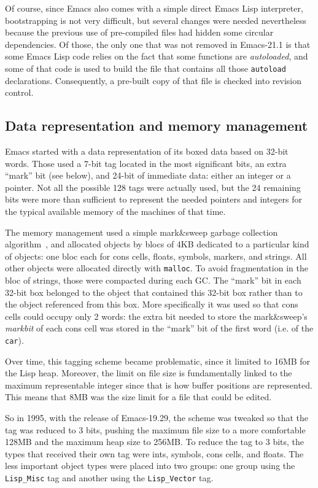 \documentclass[format=acmsmall, review]{acmart}
\newcommand \Elisp {Emacs Lisp}
\begin{document}
Of course, since Emacs also comes with a simple direct \Elisp{} interpreter,
bootstrapping is not very difficult, but several changes were needed
nevertheless because the previous use of pre-compiled files had hidden some
circular dependencies.  Of those, the only one that was not removed in
Emacs-21.1 is that some \Elisp{} code relies on the fact that some
functions are \emph{autoloaded}, and some of that code is used to build the
file that contains all those \texttt{autoload} declarations.  Consequently,
a pre-built copy of that file is checked into revision control.

\subsection{Data representation and memory management}
\label{sec:data-representation}

Emacs started with a data representation of its boxed data based on 32-bit
words.  Those used a 7-bit tag located in the most significant bits, an extra
``mark'' bit (see below), and 24-bit of immediate data: either an integer or
a pointer.  Not all the possible 128 tags were actually used, but the 24
remaining bits were more than sufficient to represent the needed pointers and
integers for the typical available memory of the machines of that time.

The memory management used a simple mark\&sweep garbage collection
algorithm~\cite{McCarthy1960}, and allocated objects by blocs of 4KB dedicated to a particular
kind of objects: one bloc each for cons cells, floats, symbols, markers, and
strings. All other objects were allocated directly with \texttt{malloc}.
To avoid fragmentation in the bloc of strings, those were compacted during
each GC.  The ``mark'' bit in each 32-bit box belonged to the object
that contained this 32-bit box rather than to the object referenced from
this box.  More specifically it was used so that cons cells could
occupy only 2 words: the extra bit needed to store the mark\&sweep's
\emph{markbit} of each cons cell was stored in the ``mark'' bit of the first
word (i.e. of the \texttt{car}).

Over time, this tagging scheme became problematic, since it limited to 16\;MB
for the Lisp heap.
Moreover, the limit on file size is fundamentally linked to the maximum representable
integer since that is how buffer positions are represented.
This means that 8\;MB was the size limit for a file that could be edited.

So in 1995, with the release of Emacs-19.29,
the scheme was tweaked so that the tag was reduced to
3 bits, pushing the maximum file size to a more comfortable 128MB and the
maximum heap size to 256\;MB.  To reduce the tag to 3 bits,
the types that received their own tag were ints, symbols, cons cells, and floats.
The less important
object types were placed into two groups: one group using the
\texttt{Lisp\_Misc} tag and another using the \texttt{Lisp\_Vector}
tag.
\end{document}
